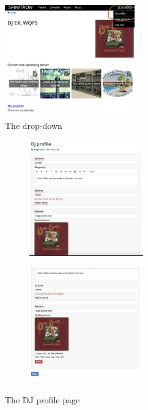 \documentclass[12pt]{article}
\begin{document}
\begin{figure}[h]
    \centering
    \includegraphics[width=0.5\textwidth]{images/Dropdown.png}
    \caption{The drop-down}
    \label{fig5}
\end{figure}

\begin{figure}[h]
 
    \begin{subfigure}{0.5\textwidth}
    \includegraphics[width=1.0\linewidth, height=5cm]{images/DJ_profile1.png} 
    \label{fig:DJp1}
    \end{subfigure}
    \begin{subfigure}{0.5\textwidth}
    \includegraphics[width=1.0\linewidth, height=5cm]{images/DJ_profile2.png}
    \label{fig:DJp2}
    \end{subfigure}
 
\caption{The DJ profile page}
\label{fig6}
\end{figure}
\end{document}
